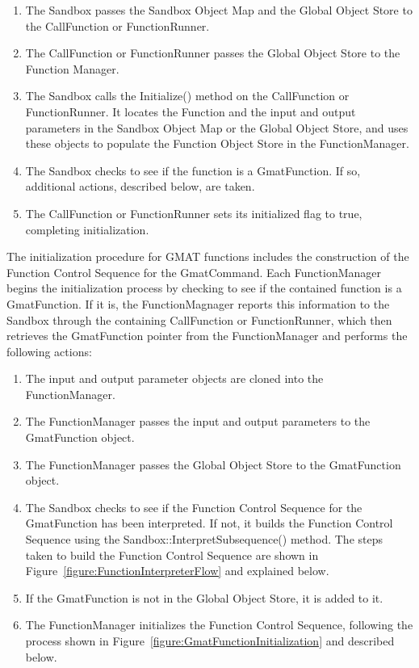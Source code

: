 \begin{enumerate}
\item The Sandbox passes the Sandbox Object Map and the Global Object Store to the CallFunction
or FunctionRunner.
\item The CallFunction or FunctionRunner passes the Global Object Store to the Function Manager.
\item The Sandbox calls the Initialize() method on the CallFunction or FunctionRunner.  It locates
the Function and the input and output parameters in the Sandbox Object Map or the Global Object
Store, and uses these objects to populate the Function Object Store in the FunctionManager.
\item The Sandbox checks to see if the function is a GmatFunction.  If so, additional actions,
described below, are taken.
\item \label{item:FunctionInitFinalStep}The CallFunction or FunctionRunner sets its initialized flag
to true, completing initialization.
\end{enumerate}

The initialization procedure for GMAT functions includes the construction of the Function Control
Sequence for the GmatCommand.  Each FunctionManager begins the initialization process by checking to
see if the contained function is a GmatFunction. If it is, the FunctionMagnager reports this
information to the Sandbox through the containing CallFunction or FunctionRunner, which then
retrieves the GmatFunction pointer from the FunctionManager and performs the following actions:

\begin{enumerate}
\item The input and output parameter objects are cloned into the FunctionManager.
\item The FunctionManager passes the input and output parameters to the GmatFunction object.
\item The FunctionManager passes the Global Object Store to the GmatFunction object.
\item The Sandbox checks to see if the Function Control Sequence for the GmatFunction has been
interpreted.  If not, it builds the Function Control Sequence using the
Sandbox::InterpretSubsequence() method.  The steps taken to build the Function Control Sequence are
shown in Figure~\ref{figure:FunctionInterpreterFlow} and explained below.
\item If the GmatFunction is not in the Global Object Store, it is added to it.
\item The FunctionManager initializes the Function Control Sequence, following the process shown in
Figure~\ref{figure:GmatFunctionInitialization} and described below.
\end{enumerate}


